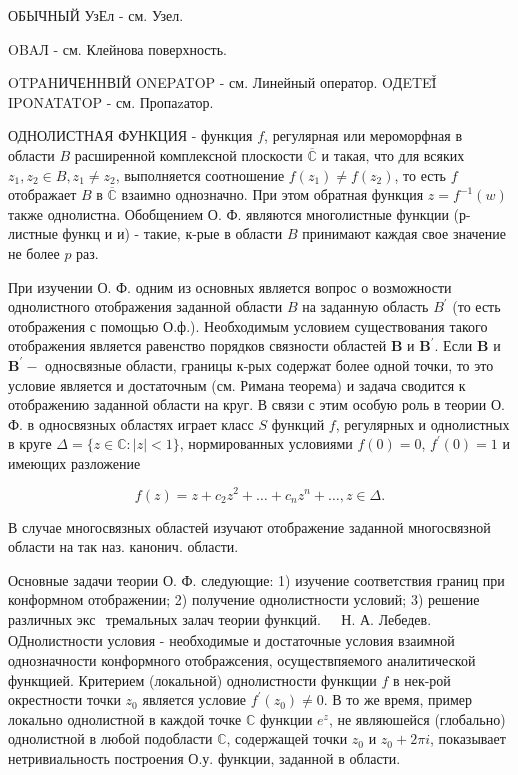 \documentclass[10pt]{article}
\begin{document}
ОБЫЧНЫЙ УзЕл - см. Узел.



OBAЛ - см. Клейнова поверхность.



OTPAHИЧЕНHВIЙ ONEPATOP - см. Линейный оператор. OДETEǏ̆ IPONATATOP - см. Пропаzатор.



ОДНОЛИСТНАЯ ФУНКЦИЯ - функция $f$, регулярная или мероморфная в области $B$ расширенной комплексной плоскости $\overline{\mathbb{C}}$ и такая, что для всяких $z_{1}, z_{2} \in B, z_{1} \neq z_{2}$, выполняется соотношение $f\left(z_{1}\right) \neq f\left(z_{2}\right)$, то есть $f$ отображает $B$ в $\overline{\mathbb{C}}$ взаимно однозначно. При этом обратная функция $z=f^{-1}(w)$ также однолистна. Обобщением О. Ф. являются многолистные функции (р-листные функц и и) - такие, к-рые в области $B$ принимают каждая свое значение не более $p$ раз.



При изучении О. Ф. одним из основных является вопрос о возможности однолистного отображения заданной области $B$ на заданную область $B^{\prime}$ (то есть отображения с помощью О.ф.). Необходимым условием существования такого отображения является равенство порядков связности областей $\boldsymbol{B}$ и $\boldsymbol{B}^{\prime}$. Если $\boldsymbol{B}$ и $\boldsymbol{B}^{\prime}-$ односвязные области, границы к-рых содержат более одной точки, то это условие является и достаточным (см. Римана теорема) и задача сводится к отображению заданной области на круг. В связи с этим особую роль в теории О. Ф. в односвязных областях играет класс $S$ функций $f$, регулярных и однолистных в круге $\Delta=\{z \in \mathbb{C}:|z|<1\}$, нормированных условиями $f(0)=0$, $f^{\prime}(0)=1$ и имеющих разложение



\[

f(z)=z+c_{2} z^{2}+\ldots+c_{n} z^{n}+\ldots, z \in \Delta .

\]



В случае многосвязных областей изучают отображение заданной многосвязной области на так наз. канонич. области.



Основные задачи теории О. Ф. следующие: 1) изучение соответствия границ при конформном отображении; 2) получение однолистности условий; 3) решение различных экс$\begin{array}{ll}\text { тремальных залач теории функций. } & \text { Н. А. Лебедев. }\end{array}$ ОДнолистности условия - необходимые и достаточные условия взаимной однозначности конформного отображсения, осуществпяемого аналитической функщией. Критерием (локальной) однолистности функщии $f$ в нек-рой окрестности точки $z_{0}$ является условие $f^{\prime}\left(z_{0}\right) \neq 0$. В то же время, пример локально однолистной в каждой точке $\mathbb{C}$ функции $e^{z}$, не являюшейся (глобально) однолистной в любой подобласти $\mathbb{C}$, содержащей точки $z_{0}$ и $z_{0}+2 \pi i$, показывает нетривиальность построения О.у. функции, заданной в области.
\end{document}
